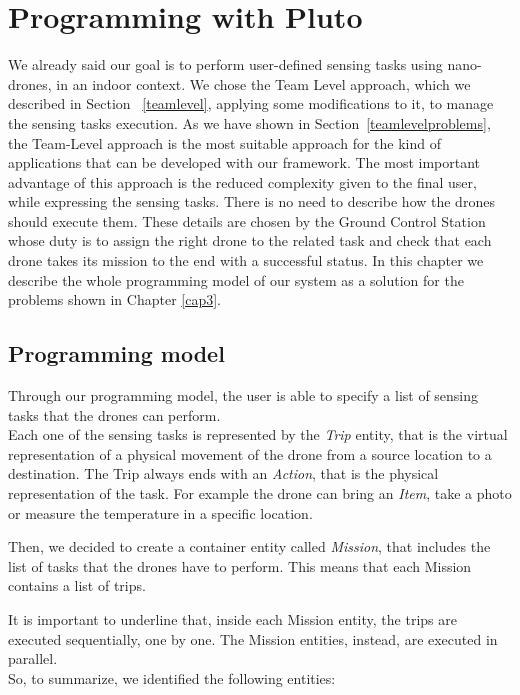 \chapter{Programming with Pluto}
\label{cap4}

We already said our goal is to perform user-defined sensing tasks using nano-drones, in an indoor context.
We chose the Team Level approach, which we described in Section ~\ref{teamlevel}, applying some modifications to it, to manage the sensing tasks execution.
As we have shown in Section~\ref{teamlevelproblems}, the Team-Level approach is the most suitable approach for the kind of applications that can be developed with our framework.
The most important advantage of this approach is the reduced complexity given to the final user, while expressing the sensing tasks.
There is no need to describe how the drones should execute them.
These details are chosen by the Ground Control Station whose duty is to assign the right drone to the related task and check that each drone takes its mission to the end with a successful status.
In this chapter we describe the whole programming model of our system as a solution for the problems shown in Chapter \ref{cap3}.


\section{Programming model}\label{programmingModel}

Through our programming model, the user is able to specify a list of sensing tasks that the drones can perform.\\
Each one of the sensing tasks is represented by the \textit{Trip} entity, that is the virtual representation of a physical movement of the drone from a source location to a destination.
The Trip always ends with an \textit{Action}, that is the physical representation of the task. 
For example the drone can bring an \textit{Item}, take a photo or measure the temperature in a specific location.

Then, we decided to create a container entity called \textit{Mission}, that includes the list of tasks that the drones have to perform. 
This means that each Mission contains a list of trips.

It is important to underline that, inside each Mission entity, the trips are executed sequentially, one by one. 
The Mission entities, instead, are executed in parallel.
\\

So, to summarize, we identified the following entities:

